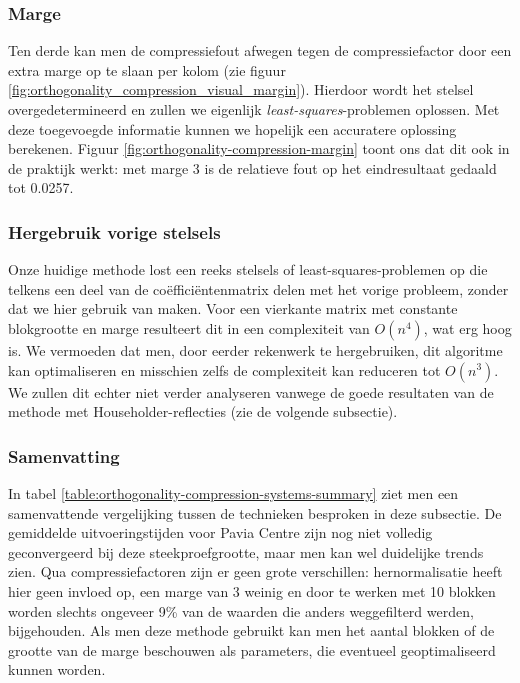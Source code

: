 \newpage
\subsubsection{Marge}

Ten derde kan men de compressiefout afwegen tegen de compressiefactor door een extra marge op te slaan per kolom (zie figuur \ref{fig:orthogonality_compression_visual_margin}). Hierdoor wordt het stelsel overgedetermineerd en zullen we eigenlijk \textit{least-squares}-problemen oplossen. Met deze toegevoegde informatie kunnen we hopelijk een accuratere oplossing berekenen. Figuur \ref{fig:orthogonality-compression-margin} toont ons dat dit ook in de praktijk werkt: met marge 3 is de relatieve fout op het eindresultaat gedaald tot 0.0257.

\subsubsection{Hergebruik vorige stelsels}

Onze huidige methode lost een reeks stelsels of least-squares-problemen op die telkens een deel van de co\"effici\"entenmatrix delen met het vorige probleem, zonder dat we hier gebruik van maken. Voor een vierkante matrix met constante blokgrootte en marge resulteert dit in een complexiteit van $O(n^4)$, wat erg hoog is. We vermoeden dat men, door eerder rekenwerk te hergebruiken, dit algoritme kan optimaliseren en misschien zelfs de complexiteit kan reduceren tot $O(n^3)$. We zullen dit echter niet verder analyseren vanwege de goede resultaten van de methode met Householder-reflecties (zie de volgende subsectie).

\subsubsection{Samenvatting}

In tabel \ref{table:orthogonality-compression-systems-summary} ziet men een samenvattende vergelijking tussen de technieken besproken in deze subsectie. De gemiddelde uitvoeringstijden voor Pavia Centre zijn nog niet volledig geconvergeerd bij deze steekproefgrootte, maar men kan wel duidelijke trends zien. Qua compressiefactoren zijn er geen grote verschillen: hernormalisatie heeft hier geen invloed op, een marge van 3 weinig en door te werken met 10 blokken worden slechts ongeveer 9\% van de waarden die anders weggefilterd werden, bijgehouden. Als men deze methode gebruikt kan men het aantal blokken of de grootte van de marge beschouwen als parameters, die eventueel geoptimaliseerd kunnen worden.


